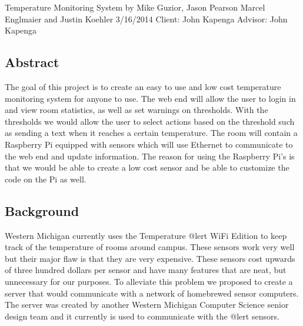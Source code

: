 \documentclass{report}
\begin{document}
\begin{titlepage}

\vspace*{\fill}
\begin{center}
Temperature Monitoring System
by Mike Guzior, Jason Pearson
Marcel Englmaier and Justin Koehler
3/16/2014
Client: John Kapenga
Advisor: John Kapenga
\end{center}
\vspace*{\fill}
\end{titlepage}
\newpage
\tableofcontents
\newpage

\subsection*{Abstract}
The goal of this project is to create an easy to use and low cost temperature monitoring system for anyone to use. The web end will allow the user to login in and view room statistics, as well as set warnings on thresholds. With the thresholds we would allow the user to select actions based on the threshold such as sending a text when it reaches a certain temperature.  The room will contain a Raspberry Pi equipped with sensors which will use Ethernet to communicate to the web end and update information. The reason for using the Raspberry Pi’s is that we would be able to create a low cost sensor and be able to customize the code on the Pi as well. 
\newpage
\subsection*{Background}
	Western Michigan currently uses the Temperature @lert WiFi Edition to keep track of the temperature of rooms around campus. These sensors work very well but their major flaw is that they are very expensive. These sensors cost upwards of three hundred dollars per sensor and have many features that are neat, but unnecessary for our purposes. To alleviate this problem we proposed to create a server that would communicate with a network of homebrewed sensor computers. The server was created by another Western Michigan Computer Science senior design team and it currently is used to communicate with the @lert sensors.  
	


\newpage

	
\end{document}
